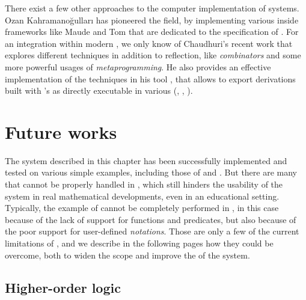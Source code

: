 \begin{remark}
  There exist a few other approaches to the computer implementation of  systems. Ozan Kahramanoğulları has pioneered the field, by
  implementing various  inside frameworks like Maude
  \cite{kahramanogullari_maude_2008} and Tom
  \cite{kahramanogullari_implementing_2005} that are dedicated to the
  specification of . For an integration within modern
  , we only know of Chaudhuri's recent work
   that explores different techniques in
  addition to reflection, like \emph{combinators} and some more powerful usages
  of \emph{metaprogramming}. He also provides an effective implementation of the
  techniques in his  tool \cite{DBLP:conf/cade/Chaudhuri21}, that
  allows to export  derivations built with 's
   as  directly executable in various  (, , ).
\end{remark}

\section{Future works}

The  system described in this chapter has been successfully
implemented and tested on various simple examples, including those of
 and . But there are many   that
cannot be properly handled in , which still hinders the usability of
the system in real mathematical developments, even in an educational setting.
Typically, the example of  cannot be completely performed in
, in this case because of the lack of support for
\emph{} functions and predicates, but also because of the poor
support for user-defined \emph{notations}. Those are only a few of the current
limitations of , and we describe in the following pages how they
could be overcome, both to widen the scope and improve the  of the
system.

\subsection{Higher-order logic}

